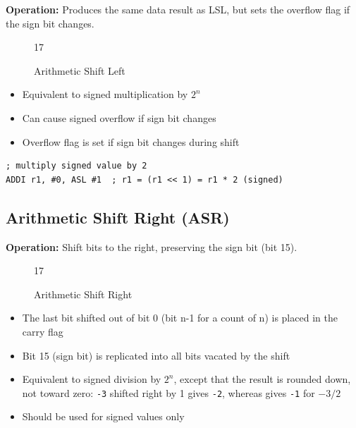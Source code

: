 \textbf{Operation:} Produces the same data result as LSL, but sets the overflow flag if the sign bit changes.

\begin{figure}[H]
	\centering
	\begin{bytefield}[bitwidth=1.2em]{17}
		 \\
	\end{bytefield}
	\caption{Arithmetic Shift Left}
\end{figure}

\begin{itemize}
	\item Equivalent to signed multiplication by $2^n$
	\item Can cause signed overflow if sign bit changes
	\item Overflow flag is set if sign bit changes during shift
\end{itemize}

\begin{example}
	\begin{lstlisting}
; multiply signed value by 2
ADDI r1, #0, ASL #1  ; r1 = (r1 << 1) = r1 * 2 (signed)
	\end{lstlisting}
	\caption{Signed Multiply by 2 (ASL)}
\end{example}

\subsection{Arithmetic Shift Right (ASR)}

\textbf{Operation:} Shift bits to the right, preserving the sign bit (bit 15).

\begin{figure}[H]
	\centering
	\begin{bytefield}[bitwidth=1.2em]{17}
		 \\
	\end{bytefield}
	\caption{Arithmetic Shift Right}
\end{figure}

\begin{itemize}
	\item The last bit shifted out of bit 0 (bit n-1 for a count of n) is placed in the carry flag
	\item Bit 15 (sign bit) is replicated into all bits vacated by the shift
	\item Equivalent to signed division by $2^n$, except that the result is rounded down, not toward zero: \texttt{-3} shifted
	      right by 1 gives \texttt{-2}, whereas  gives \texttt{-1} for $-3 / 2$
	\item Should be used for signed values only
\end{itemize}

